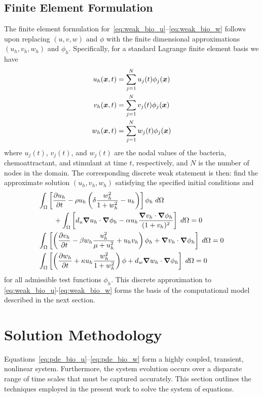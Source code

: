 \subsection{Finite Element Formulation}
The finite element formulation for~\eqref{eq:weak_bio_u}--\eqref{eq:weak_bio_w} follows upon replacing $\left(u,v,w\right)$ and $\phi$ with the finite dimensional approximations  $\left(u_h,v_h,w_h\right)$ and $\phi_h$.  Specifically, for a standard Lagrange finite element basis we have
\begin{align}
  \label{eq:bio_u_h}  
  u_h({\boldsymbol{x}},t) &= \sum_{j=1}^N u_j(t) \phi_j({\boldsymbol{x}}) \\
  \label{eq:bio_v_h}  
  v_h({\boldsymbol{x}},t) &= \sum_{j=1}^N v_j(t) \phi_j({\boldsymbol{x}}) \\
  \label{eq:bio_w_h}  
  w_h({\boldsymbol{x}},t) &= \sum_{j=1}^N w_j(t) \phi_j({\boldsymbol{x}}) 
\end{align}
where $u_j(t)$, $v_j(t)$, and $w_j(t)$ are the nodal values of the bacteria, chemoattractant, and stimulant at time $t$, respectively, and $N$ is the number of nodes in the domain. The corresponding discrete weak statement is then: find the approximate solution $\left(u_h,v_h,w_h\right)$ satisfying the specified initial conditions and 
\begin{align}
  \int_\Omega& \left[{\frac{\partial{u_h}}{\partial{t}}} - \rho u_h \left( \delta \frac{w_h^2}{1 + w_h^2} - u_h \right) \right]\phi_h\; d\Omega \nonumber \\
  \label{eq:fe_bio_u}
  &\;\;\;+ \int_\Omega \left[d_u {\boldsymbol{\nabla}} {u_h}\cdot{\boldsymbol{\nabla}} {\phi_h} - \alpha u_h \frac{{\boldsymbol{\nabla}} {v_h}\cdot{\boldsymbol{\nabla}} {\phi_h}}{(1+ v_h)^2} \right]\; d\Omega  = 0 \\  
  \label{eq:fe_bio_v}
  \int_\Omega& \left[\left({\frac{\partial{v_h}}{\partial{t}}} - \beta w_h \frac{u_h^2}{\mu + u_h^2} + u_h v_h\right)\phi_h + {\boldsymbol{\nabla}} {v_h}\cdot{\boldsymbol{\nabla}} {\phi_h}\right]\; d\Omega = 0 \\ 
  \label{eq:fe_bio_w}
  \int_\Omega& \left[\left({\frac{\partial{w_h}}{\partial{t}}} + \kappa u_h \frac{w_h^2}{1 + w_h^2}\right)\phi + d_w{\boldsymbol{\nabla}} {w_h}\cdot{\boldsymbol{\nabla}} {\phi_h}\right]\; d\Omega = 0
\end{align}
for all admissible test functions $\phi_h$.  This discrete approximation to \eqref{eq:weak_bio_u}-\eqref{eq:weak_bio_w} forms the basis of the computational model described in the next section.


\section{Solution Methodology}
Equations~\eqref{eq:pde_bio_u}--\eqref{eq:pde_bio_w} form a highly coupled, transient,  nonlinear system.  Furthermore, the system evolution occurs over a disparate range of time scales that must be captured accurately.  This section outlines the techniques employed in the present work to solve the system of equations.

